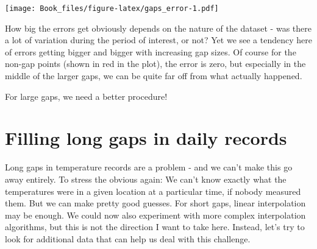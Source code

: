\documentclass[
]{book}
\newenvironment{Shaded}{\begin{snugshade}}{\end{snugshade}}
\newcommand{\DataTypeTok}[1]{\textcolor[rgb]{0.13,0.29,0.53}{#1}}
\newcommand{\DecValTok}[1]{\textcolor[rgb]{0.00,0.00,0.81}{#1}}
\newcommand{\FloatTok}[1]{\textcolor[rgb]{0.00,0.00,0.81}{#1}}
\newcommand{\KeywordTok}[1]{\textcolor[rgb]{0.13,0.29,0.53}{\textbf{#1}}}
\newcommand{\NormalTok}[1]{#1}
\newcommand{\OperatorTok}[1]{\textcolor[rgb]{0.81,0.36,0.00}{\textbf{#1}}}
\newcommand{\StringTok}[1]{\textcolor[rgb]{0.31,0.60,0.02}{#1}}
\begin{document}
\begin{Shaded}
\end{Shaded}

\texttt{[image: Book\_files/figure-latex/gaps\_error-1.pdf]}

How big the errors get obviously depends on the nature of the dataset - was there a lot of variation during the period of interest, or not? Yet we see a tendency here of errors getting bigger and bigger with increasing gap sizes. Of course for the non-gap points (shown in red in the plot), the error is zero, but especially in the middle of the larger gaps, we can be quite far off from what actually happened.

For large gaps, we need a better procedure!

\hypertarget{filling-long-gaps-in-daily-records}{%
\section{Filling long gaps in daily records}\label{filling-long-gaps-in-daily-records}}

Long gaps in temperature records are a problem - and we can't make this go away entirely. To stress the obvious again: We can't know exactly what the temperatures were in a given location at a particular time, if nobody measured them. But we can make pretty good guesses. For short gaps, linear interpolation may be enough. We could now also experiment with more complex interpolation algorithms, but this is not the direction I want to take here. Instead, let's try to look for additional data that can help us deal with this challenge.
\end{document}

